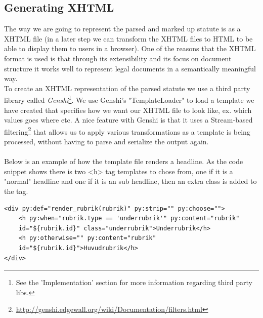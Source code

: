 \subsection{Generating XHTML}
The way we are going to represent the parsed and marked up statute is as a XHTML file (in a later step we can transform the XHTML files to HTML to be able to display them to users in a browser). One of the reasons that the XHTML format is used is that through its extensibility and its focus on document structure it works well to represent legal documents in a semantically meaningful way.\\
To create an XHTML representation of the parsed statute we use a third party library called \textit{Genshi}\footnote{See the 'Implementation' section for more information regarding third party libs.}. We use Genshi's "TemplateLoader" to load a template we have created that specifies how we want our XHTML file to look like, ex. which values goes where etc. A nice feature with Genshi is that it uses a Stream-based filtering\footnote{\url{http://genshi.edgewall.org/wiki/Documentation/filters.html}} that allows us to apply various transformations as a template is being processed, without having to parse and serialize the output again.\\\\
Below is an example of how the template file renders a headline. As the code
snippet shows there is two <h> tag templates to chose from, one if it is a "normal" headline and one if it is an sub headline, then an extra class is added to the tag.\\
\begin{verbatim}
<div py:def="render_rubrik(rubrik)" py:strip="" py:choose="">
    <h py:when="rubrik.type == 'underrubrik'" py:content="rubrik"
	id="${rubrik.id}" class="underrubrik">Underrubrik</h>
    <h py:otherwise="" py:content="rubrik"
	id="${rubrik.id}">Huvudrubrik</h>
</div>
\end{verbatim}
\linebreak  
\newline

